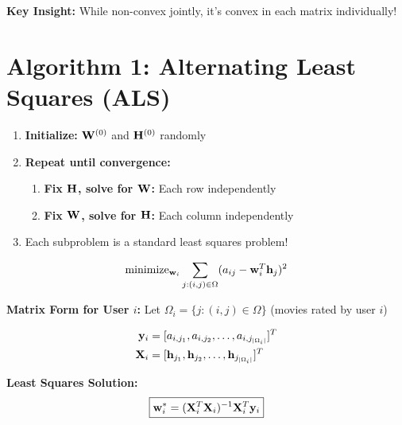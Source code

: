 \documentclass{beamer}
\begin{document}
\begin{frame}\textbf{Key Insight:} While non-convex jointly, it's convex in each matrix individually!
\end{frame}

\section{Algorithm 1: Alternating Least Squares (ALS)}

\begin{frame}\begin{enumerate}[<+->]
    \item \textbf{Initialize:} $\mathbf{W}^{(0)}$ and $\mathbf{H}^{(0)}$ randomly
    \item \textbf{Repeat until convergence:}
    \begin{enumerate}
        \item \textbf{Fix $\mathbf{H}$, solve for $\mathbf{W}$:} Each row independently
        \item \textbf{Fix $\mathbf{W}$, solve for $\mathbf{H}$:} Each column independently  
    \end{enumerate}
    \item Each subproblem is a standard least squares problem!
\end{enumerate}

\pause
\begin{center}
\end{center}
\end{frame}

\begin{frame}\begin{equation*}
\operatorname{minimize}_{\mathbf{w}_i} \sum_{j: (i,j) \in \Omega} (a_{ij} - \mathbf{w}_i^T \mathbf{h}_j)^2
\end{equation*}

\pause
\textbf{Matrix Form for User $i$:}
Let $\Omega_i = \{j: (i,j) \in \Omega\}$ (movies rated by user $i$)

\pause
\begin{align}
\mathbf{y}_i &= [a_{i,j_1}, a_{i,j_2}, \ldots, a_{i,j_{|\Omega_i|}}]^T \\
\mathbf{X}_i &= [\mathbf{h}_{j_1}, \mathbf{h}_{j_2}, \ldots, \mathbf{h}_{j_{|\Omega_i|}}]^T
\end{align}

\pause
\textbf{Least Squares Solution:}
\begin{equation*}
\boxed{\mathbf{w}_i^* = (\mathbf{X}_i^T \mathbf{X}_i)^{-1} \mathbf{X}_i^T \mathbf{y}_i}
\end{equation*}
\end{frame}
\end{document}

